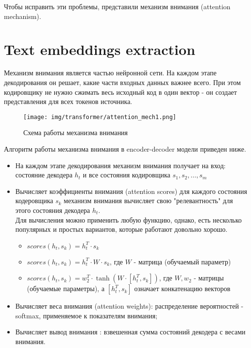 \documentclass[PMI,VKR]{HSEUniversity}
\begin{document}
Чтобы исправить эти проблемы, представили механизм внимания (attention mechanism\cite{attention:2014}).

\section{Text embeddings extraction}

Механизм внимания является частью нейронной сети. На каждом этапе декодирования он решает, какие части входных данных важнее всего. При этом кодировщику не нужно сжимать весь исходный код в один вектор - он создает представления для всех токенов источника.

\begin{figure}[h]
    \centering
    \texttt{[image: img/transformer/attention\_mech1.png]}
    \caption{Схема работы механизма внимания}
\end{figure}

\newpage
Алгоритм работы механизма внимания в encoder-decoder модели приведен ниже.

\begin{itemize}
    \item На каждом этапе декодирования механизм внимания получает на вход: состояние декодера $h_t$ и все состояния кодировщика $s_1, s_2, \dots, s_m$
    \item Вычисляет коэффициенты внимания (attention scores) для каждого состояния кодеровщика $s_k$ механизм внимания вычисляет свою "релевантность" для этого состояния декодера $h_t$. \\
          Для вычисления можно применить любую функцию, однако, есть несколько популярных и простых вариантов, которые работают довольно хорошо.
          \begin{itemize}
              \item $scores(h_t, s_k) = h_t^T \cdot s_k $
              \item $scores(h_t, s_k) = h_t^T \cdot W \cdot s_k $, где $W$ - матрица (обучаемый параметр)
              \item $scores(h_t, s_k) = w_2^T \cdot \tanh(W \cdot [h_t^T, s_k]) $, где $W, w_2$ - матрицы (обучаемые параметры), а $[h_t^T, s_k]$ означает конкатенацию векторов
          \end{itemize}

    \item Вычисляет веса внимания (attention weights): распределение вероятностей - softmax, применяемое к показателям внимания;
    \item Вычисляет вывод внимания : взвешенная сумма состояний декодера с весами внимания.
\end{itemize}
\end{document}
